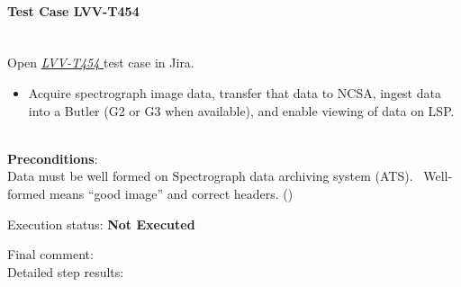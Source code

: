 \documentclass[DM,lsstdraft,STR,toc]{lsstdoc}
\providecommand{\tightlist}{
  \setlength{\itemsep}{0pt}\setlength{\parskip}{0pt}}
\begin{document}
    \paragraph{Test Case LVV-T454 }\mbox{}\\

Open  \href{https://jira.lsstcorp.org/secure/Tests.jspa#/testCase/LVV-T454}{\textit{ LVV-T454 } }
test case in Jira.

    \begin{itemize}
\tightlist
\item
  Acquire spectrograph image data, transfer that data to NCSA, ingest
  data into a Butler (G2 or G3 when available), and enable viewing of
  data on LSP. ~
\end{itemize}


    {\bf Preconditions}:\\
    Data must be well formed on Spectrograph data archiving system (ATS).
~Well-formed means ``good image'' and correct headers. () ~


    Execution status: {\bf Not Executed }

    Final comment:\\


    Detailed step results:
\end{document}
